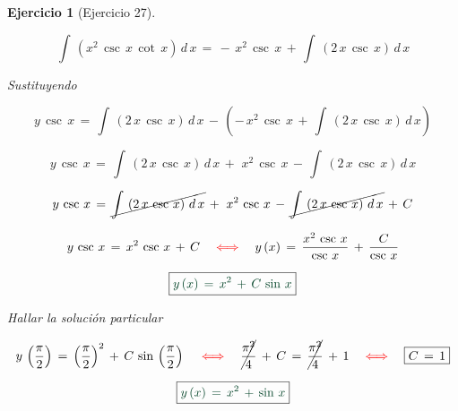 \documentclass[a4paper,11pt]{book}
\newtheorem{ejer}{Ejercicio}[section]
\begin{document}
\begin{ejer}[Ejercicio 27]
\begin{tcolorbox}[colback=red!5!white,colframe=red!75!black,fonttitle=\bfseries,title=$I_{2}$]
$$\boxed{\int\,\left(x^{2}\,\csc\,x\,\cot\,x \right)\,d\,x\,=\,-\,x^{2}\,\csc\,x\,+\,\int\,\left(2\,x\,\csc\,x \right)\,d\,x}$$ 

\end{tcolorbox} 

Sustituyendo 

$$y\,\csc\,x\,=\,\int\,\left( 2\,x\,\csc\,x \right)\,d\,x\,-\,\left(-\,x^{2}\,\csc\,x\,+\,\int\,\left(2\,x\,\csc\,x \right)\,d\,x \right)$$ 

$$y\,\csc\,x\,=\,\int\,\left( 2\,x\,\csc\,x \right)\,d\,x\,+\,\,x^{2}\,\csc\,x\,-\,\int\,\left(2\,x\,\csc\,x \right)\,d\,x $$ 

$$y\,\csc\,x\,=\,\cancel{\int\,\left( 2\,x\,\csc\,x \right)\,d\,x}\,+\,\,x^{2}\,\csc\,x\,-\,\cancel{\int\,\left(2\,x\,\csc\,x \right)\,d\,x}\,+\,C $$ 

$$y\,\csc\,x\,=\,x^{2}\,\csc\,x\,+\,C\quad \textcolor{red}{\iff} \quad y\,(x)\,=\,\dfrac{x^{2}\,\csc\,x}{\csc\,x}\,+\,\dfrac{C}{\csc\,x}$$ 

$$\boxed{\textcolor{britishracinggreen}{y\,(x)\,=\,x^{2}\,+\,C\,\sin\,x}}$$ 

 Hallar la solución particular 

$$y\,\left(\dfrac{\pi}{2} \right)\,=\,\left(\dfrac{\pi}{2} \right)^{2}\,+\,C\,\sin\,\left(\dfrac{\pi}{2} \right) \quad \textcolor{red}{\iff} \quad \cancel{\dfrac{\pi^{2}}{4}}\,+\,C\,=\,\cancel{\dfrac{\pi^{2}}{4}}\,+\,1 \quad \textcolor{red}{\iff} \quad \boxed{C\,=\,1}$$ 

$$\boxed{\textcolor{britishracinggreen}{y\,(x)\,=\,x^{2}\,+\,\sin\,x}}$$ 

\end{ejer} 
\end{document}
